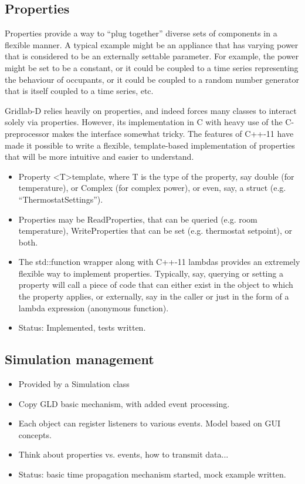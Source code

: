 \documentclass[12pt]{article}
\newcommand{\itm}[1]{\begin{itemize}#1\end{itemize}}
\begin{document}
\subsection{Properties}
Properties provide a way to ``plug together'' diverse sets of components in a flexible manner. A typical example might be an appliance that has varying power that is considered to be an externally settable parameter. For example, the power might be set to be a constant, or it could be coupled to a time series representing the behaviour of occupants, or it could be coupled to a random number generator that is itself coupled to a time series, etc.

Gridlab-D relies heavily on properties, and indeed forces many classes to interact solely via properties. However, its implementation in C with heavy use of the C-preprocessor makes the interface somewhat tricky. The features of C++-11 have made it possible to write a flexible, template-based implementation of properties that will be more intuitive and easier to understand.
\itm{
	\item Property \textless T\textgreater template, where T is the type of the property, say double (for temperature), or Complex (for complex power), or even, say, a struct (e.g. ``ThermostatSettings'').
	\item Properties may be ReadProperties, that can be queried (e.g. room temperature), WriteProperties that can be set (e.g. thermostat setpoint), or both.
	\item The std::function wrapper along with C++-11 lambdas provides an extremely flexible way to implement properties. Typically, say, querying or setting a property will call a piece of code that can either exist in the object to which the property applies, or externally, say in the caller or just in the form of a lambda expression (anonymous function).
	\item Status: Implemented, tests written.
}

\subsection{Simulation management}
\itm{
	\item Provided by a Simulation class
	\item Copy GLD basic mechanism, with added event processing.
	\item Each object can register listeners to various events. Model based on GUI concepts.
	\item Think about properties vs. events, how to transmit data...
	\item Status: basic time propagation mechanism started, mock example written.
}
\end{document}
